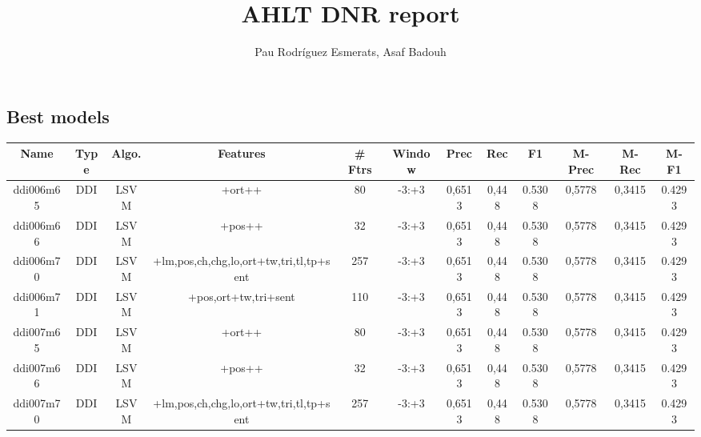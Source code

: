 \documentclass[a4paper]{article}
\title{AHLT DNR report}
\author{Pau Rodríguez Esmerats, Asaf Badouh }
\begin{document}
\begin{landscape}

\section{ Best models}
\begin{center}
\begin{tabular}{ |c|c|c|c|c|c|c|c|c|c|c|c|} 
 \hline
 	Name & Type & Algo. & Features & \# Ftrs & Window & Prec & Rec & F1 & M-Prec & M-Rec & M-F1\\
 \hline
 
 	
 		
 		\small{ ddi006m65 } & DDI & LSVM & +ort++  &  80 &  -3:+3  &  0,6513 & 0,448 & 0.5308  &  0,5778 & 0,3415 & 0.4293 \\
 		

 	
 
 	
 		
 		\small{ ddi006m66 } & DDI & LSVM & +pos++  &  32 &  -3:+3  &  0,6513 & 0,448 & 0.5308  &  0,5778 & 0,3415 & 0.4293 \\
 		

 	
 
 	
 		
 		\small{ ddi006m70 } & DDI & LSVM & +lm,pos,ch,chg,lo,ort+tw,tri,tl,tp+sent  &  257 &  -3:+3  &  0,6513 & 0,448 & 0.5308  &  0,5778 & 0,3415 & 0.4293 \\
 		

 	
 
 	
 		
 		\small{ ddi006m71 } & DDI & LSVM & +pos,ort+tw,tri+sent  &  110 &  -3:+3  &  0,6513 & 0,448 & 0.5308  &  0,5778 & 0,3415 & 0.4293 \\
 		

 	
 
 	
 		
 		\small{ ddi007m65 } & DDI & LSVM & +ort++  &  80 &  -3:+3  &  0,6513 & 0,448 & 0.5308  &  0,5778 & 0,3415 & 0.4293 \\
 		

 	
 
 	
 		
 		\small{ ddi007m66 } & DDI & LSVM & +pos++  &  32 &  -3:+3  &  0,6513 & 0,448 & 0.5308  &  0,5778 & 0,3415 & 0.4293 \\
 		

 	
 
 	
 		
 		\small{ ddi007m70 } & DDI & LSVM & +lm,pos,ch,chg,lo,ort+tw,tri,tl,tp+sent  &  257 &  -3:+3  &  0,6513 & 0,448 & 0.5308  &  0,5778 & 0,3415 & 0.4293 \\
 		


\end{tabular}
\end{center}
\end{landscape}
\end{document}

